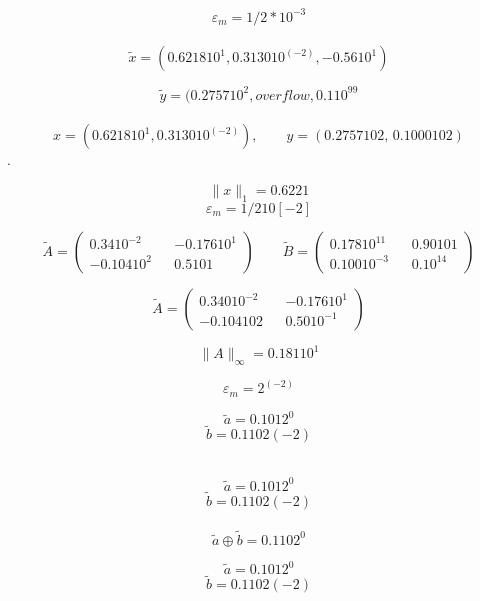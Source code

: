 \documentclass[11pt]{article}
\begin{document}
\bigskip
\medskip
$$ \varepsilon_m=1/2 *10^{-3}
$$
\\
$$\widetilde{x}=(0.6218 10^1, 0.3130 10^(-2), -0.56 10^1)$$

\medskip
$$\widetilde{y}=( 0.2757 10^2, overflow,0.1 10^99$$
\\
\bigskip
{}
$$x=(0.6218 10^1,  0.3130 10^(-2)), \quad \quad  y=(0.2757 102, \, 0.1000 102) $$.



$$ \|x\|_1= 0.6221$$
\bigskip
{}
\medskip
$$ \varepsilon_m=1/2 10[-2]$$


$$
 \widetilde A=\left(
\begin{array}{ccc}
0.34 10^{-2} && -0.176 10^1 \\
-0.104 10^{2} && 0.5 10{1}
\end{array} \right ) \quad \quad
 \widetilde B=\left(
\begin{array}{ccc}
0.178 10^{11}\ & & 0.90 101 \\
0.100 10^{-3} &  & 0.10^{14}
\end{array}
\right )
$$

\bigskip
{}
$$
 \widetilde A=\left  (
\begin{array}{ccc}
0.340 10^{-2}&& -0.176 10^1 \\
-0.104 102 && 0.50 10 ^{-1}
\end{array}
\right )
$$


$$ \|A\|_\infty= 0.181 10^1$$

\bigskip
{}
$$ \varepsilon_m= 2^(-2)$$


$$ \widetilde{a}=0.101 2^0
$$
\medskip
$$\widetilde{b}=
0.110 2(-2)$$
\\

\bigskip
{}


$$ \widetilde{a}=0.101 2^0
$$
\medskip
$$\widetilde{b}=
0.110 2(-2)$$
\\


$$\widetilde{a}\oplus \widetilde{b}= 0.110 2^0$$

\bigskip
{}




$$ \widetilde{a}=0.101 2^0
$$
\medskip
$$\widetilde{b}=
0.110 2(-2)$$
\\
\end{document}
